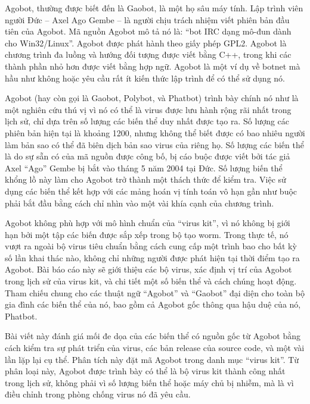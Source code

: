
Agobot, thường được biết đến là Gaobot, là một họ sâu máy tính. Lập trình viên
người Đức -- Axel Ago Gembe -- là người chịu trách nhiệm viết phiên bản đầu tiên của
Agobot. Mã nguồn Agobot mô tả nó là: ``bot IRC dạng mô-đun dành cho Win32/Linux''.
Agobot được phát hành theo giấy phép GPL2. Agobot là chương trình đa luồng và hướng
đối tượng được viết bằng C++, trong khi các thành phần nhỏ hơn được viết bằng hợp
ngữ. Agobot là một ví dụ về botnet mà hầu như không hoặc yêu cầu rất ít kiến thức lập
trình để có thể sử dụng nó.

Agobot (hay còn gọi là Gaobot, Polybot, và Phatbot) trình bày chính nó như là một
nghiên cứu thú vị vì nó có thể là virus được lưu hành rộng rãi nhất trong lịch sử, chỉ dựa
trên số lượng các biến thể duy nhất được tạo ra. Số lượng các phiên bản hiện tại là
khoảng 1200, nhưng không thể biết được có bao nhiêu người làm bản sao có thể đã biên
dịch bản sao virus của riêng họ. Số lượng các biến thể là do sự sẵn có của mã nguồn được
công bố, bị cáo buộc được viết bởi tác giả Axel ``Ago'' Gembe bị bắt vào tháng 5 năm
2004 tại Đức. Số lượng biến thể khổng lồ này làm cho Agobot trở thành một thách thức
để kiểm tra. Việc sử dụng các biến thể kết hợp với các mảng hoán vị tính toán vô hạn gần
như buộc phải bắt đầu bằng cách chỉ nhìn vào một vài khía cạnh của chương trình.

Agobot không phù hợp với mô hình chuẩn của ``virus kit'', vì nó không bị giới hạn
bởi một tập các biến được sắp xếp trong bộ tạo worm. Trong thực tế, nó vượt ra ngoài bộ
virus tiêu chuẩn bằng cách cung cấp một trình bao cho bất kỳ số lần khai thác nào, không
chỉ những người được phát hiện tại thời điểm tạo ra Agobot. Bài báo cáo này sẽ giới thiệu
các bộ virus, xác định vị trí của Agobot trong lịch sử của virus kit, và chi tiết một số biến
thể và cách chúng hoạt động. Tham chiếu chung cho các thuật ngữ ``Agobot'' và
``Gaobot'' đại diện cho toàn bộ gia đình các biến thể của nó, bao gồm cả Agobot gốc
thông qua hậu duệ của nó, Phatbot.

Bài viết này đánh giá mối đe dọa của các biến thể có nguồn gốc từ Agobot bằng cách
kiểm tra sự phát triển của virus, các bản release của source code, và một vài lần lặp lại cụ
thể. Phân tích này đặt mã Agobot trong danh mục “virus kit”. Từ phân loại này, Agobot
được trình bày có thể là bộ virus kit thành công nhất trong lịch sử, không phải vì số lượng
biến thể hoặc máy chủ bị nhiễm, mà là vì điều chỉnh trong phòng chống virus nó đã yêu
cầu.

